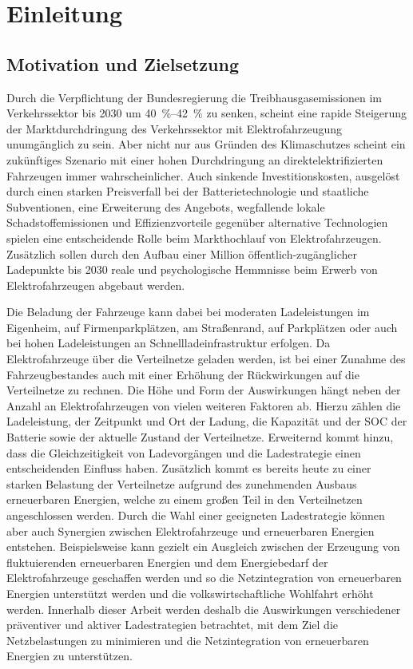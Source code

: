 \section{Einleitung}


\subsection{Motivation und Zielsetzung}

Durch die Verpflichtung der Bundesregierung die Treibhausgasemissionen im Verkehrssektor bis \num{2030} um \SIrange[range-phrase=~bis~]{40}{42}{\percent} \cite{BundesministeriumUmwelt2019} zu senken, scheint eine rapide Steigerung der Marktdurchdringung des Verkehrssektor mit Elektrofahrzeugung unumgänglich zu sein.
Aber nicht nur aus Gründen des Klimaschutzes scheint ein zukünftiges Szenario mit einer hohen Durchdringung an direktelektrifizierten Fahrzeugen immer wahrscheinlicher.
Auch sinkende Investitionskosten, ausgelöst durch einen starken Preisverfall bei der Batterietechnologie und staatliche Subventionen, eine Erweiterung des Angebots, wegfallende lokale Schadstoffemissionen und Effizienzvorteile gegenüber alternative Technologien spielen eine entscheidende Rolle beim Markthochlauf von Elektrofahrzeugen.
Zusätzlich sollen durch den Aufbau einer Million öffentlich-zugänglicher Ladepunkte bis \num{2030} \cite{DieBundesregierung2019} reale und psychologische Hemmnisse beim Erwerb von Elektrofahrzeugen abgebaut werden.\medskip

Die Beladung der Fahrzeuge kann dabei bei moderaten Ladeleistungen im Eigenheim, auf Firmenparkplätzen, am Straßenrand, auf Parkplätzen oder auch bei hohen Ladeleistungen an Schnellladeinfrastruktur erfolgen.
Da Elektrofahrzeuge über die Verteilnetze geladen werden, ist bei einer Zunahme des Fahrzeugbestandes auch mit einer Erhöhung der Rückwirkungen auf die Verteilnetze zu rechnen.
Die Höhe und Form der Auswirkungen hängt neben der Anzahl an Elektrofahrzeugen von vielen weiteren Faktoren ab.
Hierzu zählen die Ladeleistung, der Zeitpunkt und Ort der Ladung, die Kapazität und der \gls{SOC} der Batterie sowie der aktuelle Zustand der Verteilnetze.
Erweiternd kommt hinzu, dass die Gleichzeitigkeit von Ladevorgängen und die Ladestrategie einen entscheidenden Einfluss haben.
Zusätzlich kommt es bereits heute zu einer starken Belastung der Verteilnetze aufgrund des zunehmenden Ausbaus erneuerbaren Energien, welche zu einem großen Teil in den Verteilnetzen angeschlossen werden. \cite{AgoraEnergiewende2017}
Durch die Wahl einer geeigneten Ladestrategie können aber auch Synergien zwischen Elektrofahrzeuge und erneuerbaren Energien entstehen.
Beispielsweise kann gezielt ein Ausgleich zwischen der Erzeugung von fluktuierenden erneuerbaren Energien und dem Energiebedarf der Elektrofahrzeuge geschaffen werden und so die Netzintegration von erneuerbaren Energien unterstützt werden und die volkswirtschaftliche Wohlfahrt erhöht werden.
Innerhalb dieser Arbeit werden deshalb die Auswirkungen verschiedener präventiver und aktiver Ladestrategien betrachtet, mit dem Ziel die Netzbelastungen zu minimieren und die Netzintegration von erneuerbaren Energien zu unterstützen.\medskip

